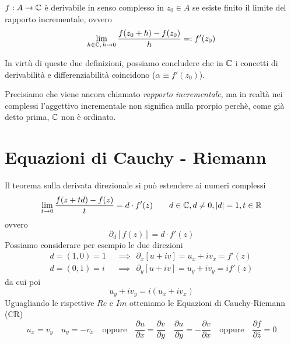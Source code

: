 \begin{defn}
$f:A\to\mathbb{C}$ è derivabile in senso complesso in $z_0\in A$ se esiste finito il limite del rapporto incrementale, ovvero
\begin{equation*}
\lim_{h\in\mathbb{C},\,h\rightarrow 0}\frac{f(z_0 + h) - f(z_0)}{h}=:f'(z_0)
\end{equation*}
\end{defn}

\begin{rem}
In virtù di queste due definizioni, possiamo concludere che in $\mathbb{C}$ i concetti di derivabilità e differenziabilità coincidono ($\alpha\equiv f'(z_0)$).
\end{rem}

Precisiamo che viene ancora chiamato \textit{rapporto incrementale}, ma in realtà nei complessi l'aggettivo incrementale non significa nulla prorpio perchè, come già detto prima, $\mathbb{C}$ non è ordinato.

\section{Equazioni di Cauchy - Riemann}

Il teorema sulla derivata direzionale si può estendere ai numeri complessi
\begin{equation*}
\lim_{t\rightarrow 0}\frac{f(z + td) - f(z)}{t} = d \cdot  f'(z) \qquad d\in\mathbb{C}, d\neq0, |d| = 1, t\in \mathbb{R}
\end{equation*}
ovvero
\begin{equation*}
\partial_{d}[f(z)] = d \cdot f'(z)
\end{equation*}
Possiamo considerare per esempio le due direzioni
\begin{align*}
d = (1, 0) = 1 & \ \ \implies \ \ \partial_{x}[u + iv] = u_{x} + iv_{x} = f'(z)\\
d = (0, 1) = i & \ \ \implies \ \ \partial_{y}[u + iv] = u_{y} + iv_{y} = if'(z)
\end{align*}
da cui poi
\begin{equation*}
u_{y} + iv_{y} = i(u_{x} + iv_{x})
\end{equation*}
Uguagliando le rispettive $Re$ e $Im$ otteniamo le Equazioni di Cauchy-Riemann (CR)
\begin{equation*}
\boxed{u_{x} = v_{y}} \quad \boxed{u_{y} = - v_{x}} \quad\text{oppure}\quad \boxed{\frac{\partial u}{\partial x}=\frac{\partial v}{\partial y}} \quad \boxed{\frac{\partial u}{\partial y}=-\frac{\partial v}{\partial x}} \quad\text{oppure}\quad \boxed{\frac{\partial f}{\partial \overline{z}}=0}
\end{equation*}

